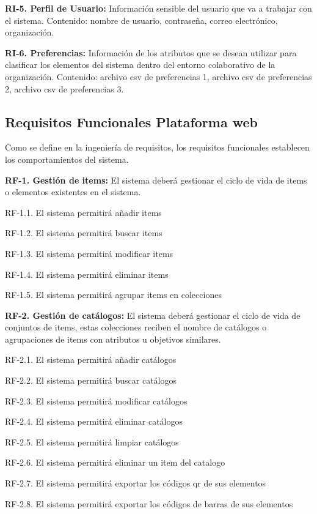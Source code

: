 \documentclass[a4paper,11pt]{book}
\begin{document}
\textbf{RI-5. Perfil de Usuario:} Información sensible del usuario que va a trabajar con el sistema. Contenido: nombre de usuario, contraseña, correo electrónico, organización. 

\textbf{RI-6. Preferencias:} Información de los atributos que se desean utilizar para clasificar los elementos del sistema dentro del entorno colaborativo de la organización.
Contenido: archivo csv de preferencias 1, archivo csv de preferencias 2, archivo csv de preferencias 3. 


\subsection{Requisitos Funcionales Plataforma web}

Como se define en la ingeniería de requisitos, los requisitos funcionales establecen los comportamientos del sistema.

\textbf{RF-1. Gestión de items:} El sistema deberá gestionar el ciclo de vida de items o elementos existentes en el sistema.
   

	RF-1.1. El sistema permitirá añadir items

	RF-1.2. El sistema permitirá buscar items

	RF-1.3. El sistema permitirá modificar items

	RF-1.4. El sistema permitirá eliminar items

	RF-1.5. El sistema permitirá agrupar items en colecciones


\textbf{RF-2. Gestión de catálogos:} El sistema deberá gestionar el ciclo de vida de conjuntos de items, estas colecciones reciben el nombre de catálogos o agrupaciones de items con atributos u objetivos similares.   


	RF-2.1. El sistema permitirá añadir catálogos

	RF-2.2. El sistema permitirá buscar catálogos

	RF-2.3. El sistema permitirá modificar catálogos

	RF-2.4. El sistema permitirá eliminar catálogos

	RF-2.5. El sistema permitirá limpiar catálogos

	RF-2.6. El sistema permitirá eliminar un item del catalogo

	RF-2.7. El sistema permitirá exportar los códigos qr de sus elementos

	RF-2.8. El sistema permitirá exportar los códigos de barras de sus elementos
\end{document}
